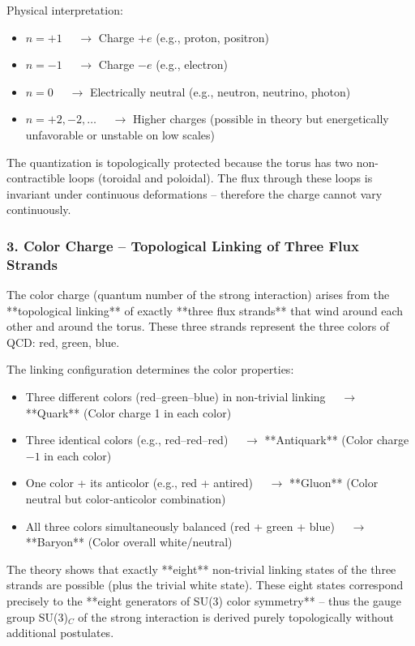 \documentclass[12pt,a4paper]{article}
\begin{document}
Physical interpretation:
\begin{itemize}
	\item $n = +1$ $\quad \to$ Charge $+e$ \quad (e.g., proton, positron)
	\item $n = -1$ $\quad \to$ Charge $-e$ \quad (e.g., electron)
	\item $n = 0$   $\quad \to$ Electrically neutral \quad (e.g., neutron, neutrino, photon)
	\item $n = +2, -2, \dots$ $\quad \to$ Higher charges (possible in theory but energetically unfavorable or unstable on low scales)
\end{itemize}

The quantization is topologically protected because the torus has two non-contractible loops (toroidal and poloidal). The flux through these loops is invariant under continuous deformations – therefore the charge cannot vary continuously.

\subsubsection{3. Color Charge – Topological Linking of Three Flux Strands}

The color charge (quantum number of the strong interaction) arises from the **topological linking** of exactly **three flux strands** that wind around each other and around the torus. These three strands represent the three colors of QCD: red, green, blue.

The linking configuration determines the color properties:
\begin{itemize}
	\item Three different colors (red–green–blue) in non-trivial linking $\quad \to$ **Quark** \quad (Color charge 1 in each color)
	\item Three identical colors (e.g., red–red–red) $\quad \to$ **Antiquark** \quad (Color charge $-1$ in each color)
	\item One color + its anticolor (e.g., red + antired) $\quad \to$ **Gluon** \quad (Color neutral but color-anticolor combination)
	\item All three colors simultaneously balanced (red + green + blue) $\quad \to$ **Baryon** \quad (Color overall white/neutral)
\end{itemize}

The theory shows that exactly **eight** non-trivial linking states of the three strands are possible (plus the trivial white state). These eight states correspond precisely to the **eight generators of SU(3) color symmetry** – thus the gauge group SU(3)$_C$ of the strong interaction is derived purely topologically without additional postulates.
\end{document}
